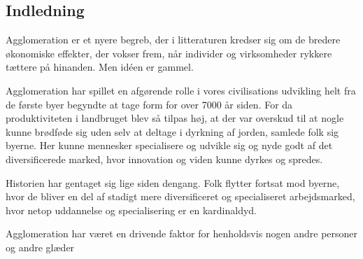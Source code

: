 \subsection{Indledning}
Agglomeration er et nyere begreb, der i litteraturen kredser sig om de bredere økonomiske effekter, der vokser frem, når individer og virksomheder rykkere tættere på hinanden. Men idéen er gammel.

Agglomeration har spillet en afgørende rolle i vores civilisations udvikling helt fra de første byer begyndte at tage form for over 7000 år siden. For da produktiviteten i landbruget blev så tilpas høj, at der var overskud til at nogle kunne brødføde sig uden selv at deltage i dyrkning af jorden, samlede folk sig byerne. Her kunne mennesker specialisere og udvikle sig og nyde godt af det diversificerede marked, hvor innovation og viden kunne dyrkes og spredes.

Historien har gentaget sig lige siden dengang. Folk flytter fortsat mod byerne, hvor de bliver en del af stadigt mere diversificeret og specialiseret arbejdsmarked, hvor netop uddannelse og specialisering er en kardinaldyd.

Agglomeration har været en drivende faktor for henholdsvis nogen andre personer og andre glæder
